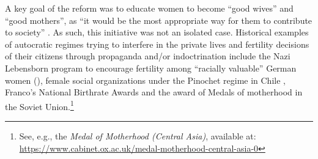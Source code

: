 \documentclass[a4paper,oneside,final,onecolumn,12pt,english]{article}
\begin{document}
A key goal of the reform was to educate women to become “good wives” and “good mothers”, as “it would be the most appropriate way for them to contribute to society” \citep[p. 213]{perez_canto}. As such, this initiative was not an isolated case. Historical examples of autocratic regimes trying to interfere in the private lives and fertility decisions of their citizens through propaganda and/or indoctrination include the Nazi Lebensborn program to %
encourage fertility among “racially valuable” German women (\citeauthor{holocaust}), female social organizations under the Pinochet regime in Chile \citep{gonzalez2024empowerment}, Franco's National Birthrate Awards and  the award of Medals of motherhood in the Soviet Union.\footnote{See, e.g., the \textit{Medal of Motherhood (Central Asia)}, available at: \url{https://www.cabinet.ox.ac.uk/medal-motherhood-central-asia-0}} %
\end{document}
